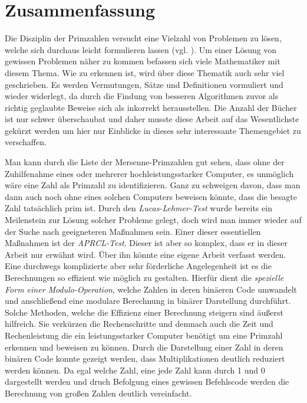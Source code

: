 \documentclass[12pt,a4paper]{article}
\theoremstyle{definition}
\begin{document}
\newpage
\section{Zusammenfassung}
Die Disziplin der Primzahlen versucht eine Vielzahl von Problemen zu lösen, welche sich durchaus leicht formulieren lassen (vgl. \cite[13]{Pomerance1996}).
Um einer Lösung von gewissen Problemen näher zu kommen befassen sich viele Mathematiker mit diesem Thema.
Wie zu erkennen ist, wird über diese Thematik auch sehr viel geschrieben.
Es werden Vermutungen, Sätze und Definitionen vormuliert und wieder widerlegt, da durch die Findung von besseren Algorithmen zuvor als richtig geglaubte Beweise sich als inkorrekt herausstellen.
Die Anzahl der Bücher ist nur schwer überschaubat und daher musste diese Arbeit auf das Wesentlichste gekürzt werden um hier nur Einblicke in dieses sehr interessante Themengebiet zu verschaffen.

Man kann durch die Liste der Mersenne-Primzahlen gut sehen, dass ohne der Zuhilfenahme eines oder mehrerer hochleistungsstarker Computer, es unmöglich wäre eine Zahl als Primzahl zu identifizieren.
Ganz zu schweigen davon, dass man dann auch noch ohne eines solchen Computers beweisen könnte, dass die besagte Zahl tatsächlich prim ist.
Durch den \textit{Lucas-Lehmer-Test} wurde bereits ein Meilenstein zur Lösung solcher Probleme gelegt, doch wird man immer wieder auf der Suche nach geeigneteren Maßnahmen sein.
Einer dieser essentiellen Maßnahmen ist der \textit{APRCL-Test}.
Dieser ist aber so komplex, dass er in dieser Arbeit nur erwähnt wird.
Über ihn könnte eine eigene Arbeit verfasst werden.
Eine durchwegs komplizierte aber sehr förderliche Angelegenheit ist es die Berechnungen so effizient wie möglich zu gestalten.
Hierfür dient die \textit{spezielle Form einer Modulo-Operation}, welche Zahlen in deren binäeren Code umwandelt und anschließend eine modulare Berechnung in binärer Darstellung durchführt.
Solche Methoden, welche die Effizienz einer Berechnung steigern sind äußerst hilfreich.
Sie verkürzen die Rechenschritte und demnach auch die Zeit und Rechenleistung die ein leistungsstarker Computer benötigt um eine Primzahl erkennen und beweisen zu können.
Durch die Darstellung einer Zahl in deren binären Code konnte gezeigt werden, dass Multiplikationen deutlich reduziert werden können.
Da egal welche Zahl, eine jede Zahl kann durch 1 und 0 dargestellt werden und druch Befolgung eines gewissen Befehlscode werden die Berechnung von großen Zahlen deutlich vereinfacht.
\end{document}

